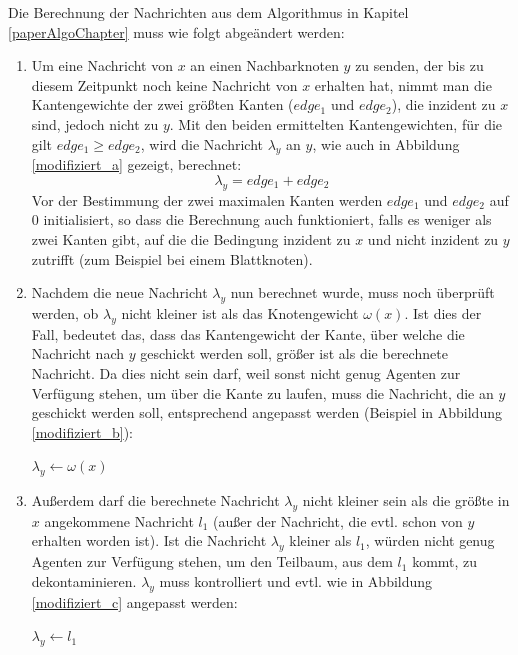 Die Berechnung der Nachrichten aus dem Algorithmus in Kapitel \ref{paperAlgoChapter} muss wie folgt abgeändert werden:

\begin{enumerate}[label=\alph*)]
	
	\item 
		Um eine Nachricht von $x$ an einen Nachbarknoten $y$ zu senden, der bis zu diesem Zeitpunkt noch keine Nachricht von $x$ erhalten hat, nimmt man die Kantengewichte der zwei größten Kanten ($edge_{1}$ und $edge_{2}$), die inzident zu $x$ sind, jedoch nicht zu $y$. Mit den beiden ermittelten Kantengewichten, für die gilt $edge_{1} \ge edge_{2}$, wird die Nachricht $\lambda_{y}$ an $y$, wie auch in Abbildung \ref{modifiziert_a} gezeigt, berechnet:
		$$\lambda_{y} = edge_{1} + edge_{2}$$
		Vor der Bestimmung der zwei maximalen Kanten werden $edge_{1}$ und $edge_{2}$ auf 0 initialisiert, so dass die Berechnung auch funktioniert, falls es weniger als zwei Kanten gibt, auf die die Bedingung inzident zu $x$ und nicht inzident zu $y$ zutrifft (zum Beispiel bei einem Blattknoten).
	
	\item
		Nachdem die neue Nachricht $\lambda_{y}$ nun berechnet wurde, muss noch überprüft werden, ob $\lambda_{y}$ nicht kleiner ist als das Knotengewicht $\omega(x)$. Ist dies der Fall, bedeutet das, dass das Kantengewicht der Kante, über welche die Nachricht nach $y$ geschickt werden soll, größer ist als die berechnete Nachricht. Da dies nicht sein darf, weil sonst nicht genug Agenten zur Verfügung stehen, um über die Kante zu laufen, muss die Nachricht, die an $y$ geschickt werden soll, entsprechend angepasst werden (Beispiel in Abbildung \ref{modifiziert_b}):
		
		\begin{algorithmic}
			\State $\lambda_{y} \gets \omega(x)$
			\EndIf
		\end{algorithmic}
	
	\item
		Außerdem darf die berechnete Nachricht $\lambda_{y}$ nicht kleiner sein als die größte in $x$ angekommene Nachricht $l_{1}$ (außer der Nachricht, die evtl. schon von $y$ erhalten worden ist). Ist die Nachricht $\lambda_{y}$ kleiner als $l_{1}$, würden nicht genug Agenten zur Verfügung stehen, um den Teilbaum, aus dem $l_{1}$ kommt, zu dekontaminieren. $\lambda_{y}$ muss kontrolliert und evtl. wie in Abbildung \ref{modifiziert_c} angepasst werden:
		
		\begin{algorithmic}
			\If {$\lambda_{y} \leq l_{1}$}
			\State $\lambda_{y} \gets l_{1}$
			\EndIf
		\end{algorithmic}
	
\end{enumerate}

